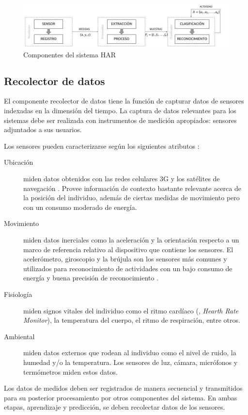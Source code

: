 \begin{figure}[!tbph]
\centering{}\includegraphics[width=1\linewidth]{capitulo-4/graphics/diagrama_4_1}\caption{Componentes del sistema HAR}
\label{fig:comphar}
\end{figure}


\subsection{Recolector de datos}

El componente recolector de datos tiene la función de capturar datos
de sensores indexadas en la dimensión del tiempo. La captura de datos
relevantes para los sistemas  debe ser realizada con instrumentos
de medición apropiados: sensores adjuntados a sus usuarios. 

Los sensores pueden caracterizarse según los siguientes atributos
\cite{LaraLabrador2013}:
\begin{description}
\item [{Ubicación}] miden datos obtenidos con las redes celulares 3G y
los satélites de navegación . Provee información de contexto
bastante relevante acerca de la posición del individuo, además de
ciertas medidas de movimiento pero con un consumo moderado de energía.
\item [{Movimiento}] miden datos inerciales como la aceleración y la orientación
respecto a un marco de referencia relativo al dispositivo que contiene
los sensores. El acelerómetro, giroscopio y la brújula son los sensores
más comunes y utilizados para reconocimiento de actividades con un
bajo consumo de energía y buena precisión de reconocimiento \cite{Bao2004,LaraLabrador2012}.
\item [{Fisiología}] miden signos vitales del individuo como el ritmo cardíaco
(, \emph{Hearth Rate Monitor}), la temperatura del cuerpo,
el ritmo de respiración, entre otros.
\item [{Ambiental}] miden datos externos que rodean al individuo como el
nivel de ruido, la humedad y/o la temperatura. Los sensores de luz,
cámara, micrófonos y termómetros miden estos datos. 
\end{description}
Los datos de medidos deben ser registrados de manera secuencial y
transmitidos para su posterior procesamiento por otros componentes
del sistema. En ambas etapas, aprendizaje y predicción, se deben recolectar
datos de los sensores.

